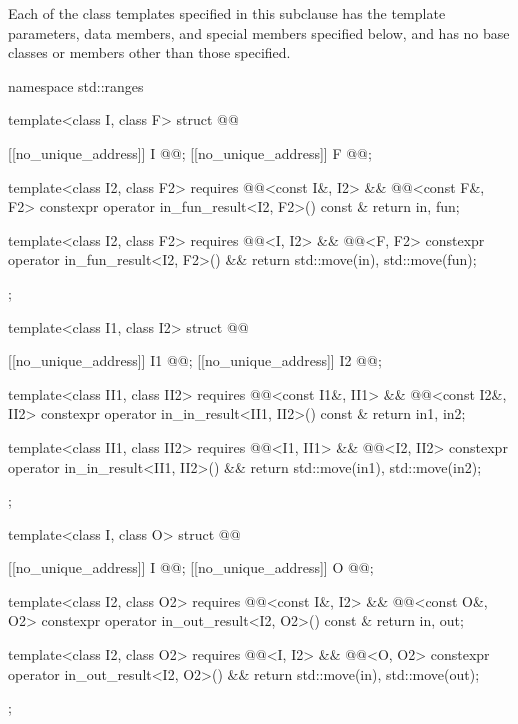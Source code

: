 \pnum
Each of the class templates specified in this subclause
has the template parameters, data members, and special members specified below,
and has no base classes or members other than those specified.

\begin{codeblock}
namespace std::ranges {
  template<class I, class F>
  struct @@ {
    [[no_unique_address]] I @@;
    [[no_unique_address]] F @@;

    template<class I2, class F2>
      requires @@<const I&, I2> && @@<const F&, F2>
    constexpr operator in_fun_result<I2, F2>() const & {
      return {in, fun};
    }

    template<class I2, class F2>
      requires @@<I, I2> && @@<F, F2>
    constexpr operator in_fun_result<I2, F2>() && {
      return {std::move(in), std::move(fun)};
    }
  };

  template<class I1, class I2>
  struct @@ {
    [[no_unique_address]] I1 @@;
    [[no_unique_address]] I2 @@;

    template<class II1, class II2>
      requires @@<const I1&, II1> && @@<const I2&, II2>
    constexpr operator in_in_result<II1, II2>() const & {
      return {in1, in2};
    }

    template<class II1, class II2>
      requires @@<I1, II1> && @@<I2, II2>
    constexpr operator in_in_result<II1, II2>() && {
      return {std::move(in1), std::move(in2)};
    }
  };

  template<class I, class O>
  struct @@ {
    [[no_unique_address]] I @@;
    [[no_unique_address]] O @@;

    template<class I2, class O2>
      requires @@<const I&, I2> && @@<const O&, O2>
    constexpr operator in_out_result<I2, O2>() const & {
      return {in, out};
    }

    template<class I2, class O2>
      requires @@<I, I2> && @@<O, O2>
    constexpr operator in_out_result<I2, O2>() && {
      return {std::move(in), std::move(out)};
    }
  };

}
\end{codeblock}
